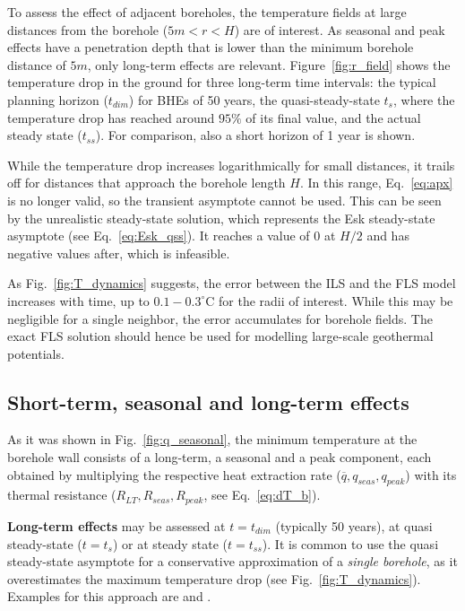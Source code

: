 To assess the effect of adjacent boreholes, the temperature fields at large distances from the borehole ($5m < r < H$) are of interest. As seasonal and peak effects have a penetration depth that is lower than the minimum borehole distance of $5m$, only long-term effects are relevant. Figure~\ref{fig:r_field} shows the temperature drop in the ground for three long-term time intervals: the typical planning horizon ($t_{dim}$) for BHEs of 50 years, the quasi-steady-state $t_s$, where the temperature drop has reached around $95\%$ of its final value, and the actual steady state ($t_{ss}$). For comparison, also a short horizon of 1 year is shown.

While the temperature drop increases logarithmically for small distances, it trails off for distances that approach the borehole length $H$. In this range, Eq.~\ref{eq:apx} is no longer valid, so the transient asymptote cannot be used. This can be seen by the unrealistic steady-state solution, which represents the Esk steady-state asymptote (see Eq.~\ref{eq:Esk_qss}). It reaches a value of $0$ at $H/2$ and has negative values after, which is infeasible.

As Fig.~\ref{fig:T_dynamics} suggests, the error between the ILS and the FLS model increases with time, up to $0.1-0.3 ^\circ$C for the radii of interest. While this may  be negligible for a single neighbor, the error accumulates for borehole fields.  The exact FLS solution should hence be used for modelling large-scale geothermal potentials.

\subsection{Short-term, seasonal and long-term effects}
\label{seas_peak}

As it was shown in Fig.~\ref{fig:q_seasonal}, the minimum temperature at the borehole wall consists of a long-term, a seasonal and a peak component, each obtained by multiplying the respective heat extraction rate ($\overline{q}, q_{seas}, q_{peak}$) with its thermal resistance ($R_{LT},R_{seas},R_{peak}$, see Eq.~\ref{eq:dT_b}). 

\textbf{Long-term effects} may be assessed at $t = t_{dim}$ (typically 50 years), at quasi steady-state ($t = t_s$) or at steady state ($t = t_{ss}$). It is common to use the quasi steady-state asymptote for a conservative approximation of a \textit{single borehole}, as it overestimates the maximum temperature drop (see Fig.~\ref{fig:T_dynamics}). Examples for this approach are \cite{claesson_conductive_1988} and \cite{pahud_geothermal_2002}. 

